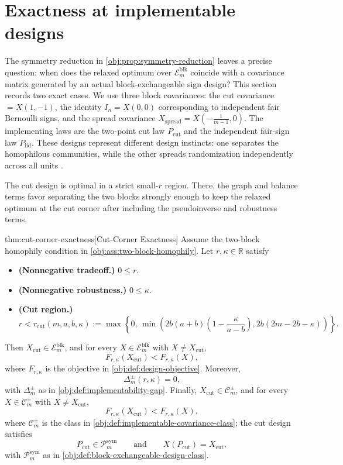 \documentclass[11pt]{article}
\begin{document}
\section{Exactness at implementable designs}

The symmetry reduction in \cref{obj:prop:symmetry-reduction} leaves a precise question: when does the relaxed optimum over \(\mathcal E_m^{\mathrm{blk}}\) coincide with a covariance matrix generated by an actual block-exchangeable sign design? This section records two exact cases. We use three block covariances: the cut covariance \(=X(1,-1)\), the identity \(I_n=X(0,0)\) corresponding to independent fair Bernoulli signs, and the spread covariance \(X_{\mathrm{spread}}=X\!\left(-\tfrac{1}{m-1},0\right)\). The implementing laws are the two-point cut law \(P_{\mathrm{cut}}\) and the independent fair-sign law \(P_{\mathrm{iid}}\). These designs represent different design instincts: one separates the homophilous communities, while the other spreads randomization independently across all units \citep{efron1971,morgan2012,harshaw2019}.

The cut design is optimal in a strict small-\(r\) region. There, the graph and balance terms favor separating the two blocks strongly enough to keep the relaxed optimum at the cut corner after including the pseudoinverse and robustness terms.

\begin{theoremv}{thm:cut-corner-exactness}[Cut-Corner Exactness]
Assume the two-block homophily condition in \cref{obj:ass:two-block-homophily}. Let \(r,\kappa\in\mathbb R\) satisfy
\begin{itemize}
\item \textbf{(Nonnegative tradeoff.)} \(0\le r\).
\item \textbf{(Nonnegative robustness.)} \(0\le \kappa\).
\item \textbf{(Cut region.)}
\[
r< r_{\mathrm{cut}}(m,a,b,\kappa)
:= \max\!\left\{0,\,
\min\!\left(
2b(a+b)\left(1-\frac{\kappa}{a-b}\right),
2b(2m-2b-\kappa)
\right)\right\}.
\]
\end{itemize}
Then \(X_{\mathrm{cut}}\in\mathcal E_m^{\mathrm{blk}}\), and for every
\(X\in\mathcal E_m^{\mathrm{blk}}\) with \(X\ne X_{\mathrm{cut}}\),
\[
F_{r,\kappa}(X_{\mathrm{cut}})<F_{r,\kappa}(X),
\]
where \(F_{r,\kappa}\) is the objective in \cref{obj:def:design-objective}. Moreover,
\[
\Delta_m^{\pm}(r,\kappa)=0,
\]
with \(\Delta_m^{\pm}\) as in \cref{obj:def:implementability-gap}. Finally,
\(X_{\mathrm{cut}}\in\mathcal C_m^{\pm}\), and for every
\(X\in\mathcal C_m^{\pm}\) with \(X\ne X_{\mathrm{cut}}\),
\[
F_{r,\kappa}(X_{\mathrm{cut}})<F_{r,\kappa}(X),
\]
where \(\mathcal C_m^{\pm}\) is the class in \cref{obj:def:implementable-covariance-class}; the cut design satisfies
\[
P_{\mathrm{cut}}\in\mathcal P_m^{\mathrm{sym}}
\qquad\text{and}\qquad
X(P_{\mathrm{cut}})=X_{\mathrm{cut}},
\]
with \(\mathcal P_m^{\mathrm{sym}}\) as in \cref{obj:def:block-exchangeable-design-class}.
\end{theoremv}
\end{document}
